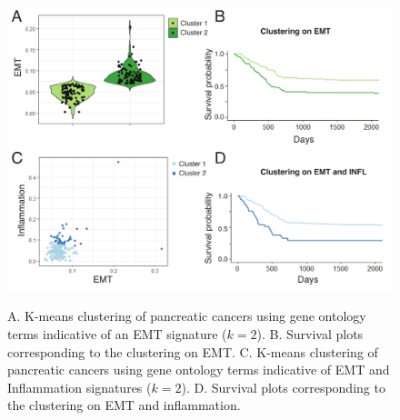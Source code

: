 \documentclass[11pt]{article}
\begin{document}
\begin{figure}
\center
{\includegraphics[width=0.95\columnwidth]{FigTCGA.pdf}}
\caption{A. K-means clustering of pancreatic cancers using gene ontology terms indicative of an EMT signature ($k=2$). B. Survival plots corresponding to the clustering on EMT. C. K-means clustering of pancreatic cancers using gene ontology terms indicative of EMT and Inflammation signatures ($k=2$). D. Survival plots corresponding to the clustering on EMT and inflammation.}
\label{fig:tcga}
\end{figure}



\end{document}
